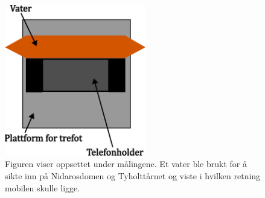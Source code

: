  
\begin{figure}
    \centering
    \includegraphics[width=0.55\textwidth]{img/Plattform med vater.pdf}
    \caption{Figuren viser oppsettet under målingene. Et vater ble brukt for å sikte inn på Nidarosdomen og Tyholttårnet og viste i hvilken retning mobilen skulle ligge. 
        }
    \label{fig:med_vater}
\end{figure}